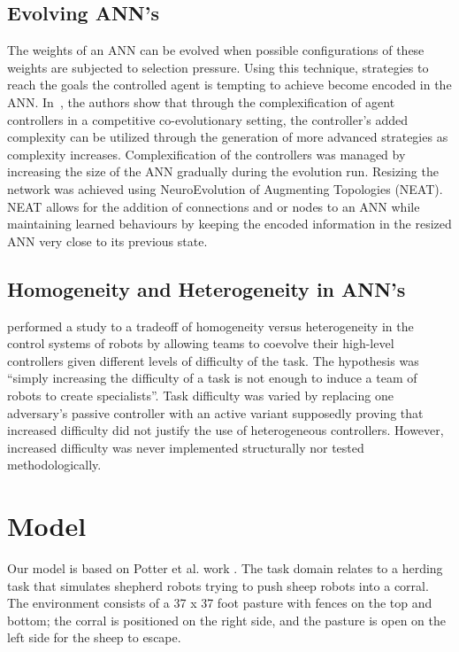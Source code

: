 \documentclass[conference]{IEEEtran}
\begin{document}
\subsection{Evolving ANN's}
The weights of an ANN can be evolved when possible configurations of these weights are subjected to selection pressure.
Using this technique, strategies to reach the goals the controlled agent is tempting to achieve become encoded in the ANN.
In~\cite{stanley2004competitive}, the authors show that through the complexification of agent controllers in a competitive co-evolutionary setting, the controller's added complexity can be utilized through the generation of more advanced strategies as complexity increases. 
Complexification of the controllers was managed by increasing the size of the ANN gradually during the evolution run.
Resizing the network was achieved using NeuroEvolution of Augmenting Topologies (NEAT).
NEAT allows for the addition of connections and or nodes to an ANN while maintaining learned behaviours by keeping the encoded information in the resized ANN very close to its previous state.

\subsection{Homogeneity and Heterogeneity in ANN's}
\cite{potter2001heterogeneity} performed a study to a tradeoff of homogeneity versus heterogeneity in the control systems of robots by allowing teams to coevolve their high-level controllers given different levels of difficulty of the task.
The hypothesis was ``simply increasing the difficulty of a task is not enough to induce a team of robots to create specialists''.
Task difficulty was varied by replacing one adversary's passive controller with an active variant supposedly proving that increased difficulty did not justify the use of heterogeneous controllers.
However, increased difficulty was never implemented structurally nor tested methodologically. 


\section{Model}
Our model is based on Potter et al. work \cite{potter2001heterogeneity}. The task domain relates to a herding task that simulates shepherd robots trying to push sheep robots into a corral. The environment consists of a 37 x 37 foot pasture with fences on the top and bottom; the corral is positioned on the right side, and the pasture is open on the left side for the sheep to escape.
\end{document}
